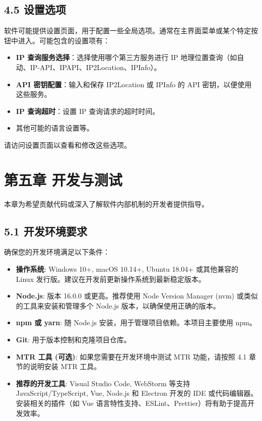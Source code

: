 \documentclass{article}
\begin{document}
\subsection*{4.5 设置选项}

软件可能提供设置页面，用于配置一些全局选项。通常在主界面菜单或某个特定按钮中进入。可能包含的设置项有：

\begin{itemize}
    \item \textbf{IP 查询服务选择}：选择使用哪个第三方服务进行 IP 地理位置查询（如自动、IP-API、IPAPI、IP2Location、IPInfo）。
    \item \textbf{API 密钥配置}：输入和保存 IP2Location 或 IPInfo 的 API 密钥，以便使用这些服务。
    \item \textbf{IP 查询超时}：设置 IP 查询请求的超时时间。
    \item 其他可能的语言设置等。
\end{itemize}

请访问设置页面以查看和修改这些选项。

\hrulefill

\section*{第五章 开发与测试}

本章为希望贡献代码或深入了解软件内部机制的开发者提供指导。

\subsection*{5.1 开发环境要求}

确保您的开发环境满足以下条件：

\begin{itemize}
    \item \textbf{操作系统}: Windows 10+, macOS 10.14+, Ubuntu 18.04+ 或其他兼容的 Linux 发行版。建议在开发前更新操作系统到最新稳定版本。
    \item \textbf{Node.js}: 版本 16.0.0 或更高。推荐使用 Node Version Manager (nvm) 或类似的工具来安装和管理多个 Node.js 版本，以确保使用正确的版本。
    \item \textbf{npm 或 yarn}: 随 Node.js 安装，用于管理项目依赖。本项目主要使用 npm。
    \item \textbf{Git}: 用于版本控制和克隆项目仓库。
    \item \textbf{MTR 工具 (可选)}: 如果您需要在开发环境中测试 MTR 功能，请按照 4.1 章节的说明安装 MTR 工具。
    \item \textbf{推荐的开发工具}: Visual Studio Code, WebStorm 等支持 JavaScript/TypeScript, Vue, Node.js 和 Electron 开发的 IDE 或代码编辑器。安装相关的插件（如 Vue 语言特性支持、ESLint、Prettier）将有助于提高开发效率。
\end{itemize}
\end{document}
